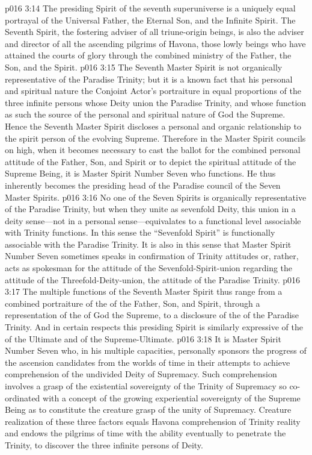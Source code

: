 \pc \vs p016 3:14  The presiding Spirit of the seventh superuniverse is a uniquely equal portrayal of the Universal Father, the Eternal Son, and the Infinite Spirit. The Seventh Spirit, the fostering adviser of all triune\hyp{}origin beings, is also the adviser and director of all the ascending pilgrims of Havona, those lowly beings who have attained the courts of glory through the combined ministry of the Father, the Son, and the Spirit.
\vs p016 3:15 The Seventh Master Spirit is not organically representative of the Paradise Trinity; but it is a known fact that his personal and spiritual nature  the Conjoint Actor’s portraiture in equal proportions of the three infinite persons whose Deity union  the Paradise Trinity, and whose function as such  the source of the personal and spiritual nature of God the Supreme. Hence the Seventh Master Spirit discloses a personal and organic relationship to the spirit person of the evolving Supreme. Therefore in the Master Spirit councils on high, when it becomes necessary to cast the ballot for the combined personal attitude of the Father, Son, and Spirit or to depict the spiritual attitude of the Supreme Being, it is Master Spirit Number Seven who functions. He thus inherently becomes the presiding head of the Paradise council of the Seven Master Spirits.
\vs p016 3:16 No one of the Seven Spirits is organically representative of the Paradise Trinity, but when they unite as sevenfold Deity, this union in a deity sense---not in a personal sense---equivalates to a functional level associable with Trinity functions. In this sense the “Sevenfold Spirit” is functionally associable with the Paradise Trinity. It is also in this sense that Master Spirit Number Seven sometimes speaks in confirmation of Trinity attitudes or, rather, acts as spokesman for the attitude of the Sevenfold\hyp{}Spirit\hyp{}union regarding the attitude of the Threefold\hyp{}Deity\hyp{}union, the attitude of the Paradise Trinity.
\vs p016 3:17 The multiple functions of the Seventh Master Spirit thus range from a combined portraiture of the  of the Father, Son, and Spirit, through a representation of the  of God the Supreme, to a disclosure of the  of the Paradise Trinity. And in certain respects this presiding Spirit is similarly expressive of the  of the Ultimate and of the Supreme\hyp{}Ultimate.
\vs p016 3:18 It is Master Spirit Number Seven who, in his multiple capacities, personally sponsors the progress of the ascension candidates from the worlds of time in their attempts to achieve comprehension of the undivided Deity of Supremacy. Such comprehension involves a grasp of the existential sovereignty of the Trinity of Supremacy so co\hyp{}ordinated with a concept of the growing experiential sovereignty of the Supreme Being as to constitute the creature grasp of the unity of Supremacy. Creature realization of these three factors equals Havona comprehension of Trinity reality and endows the pilgrims of time with the ability eventually to penetrate the Trinity, to discover the three infinite persons of Deity.\plusone
